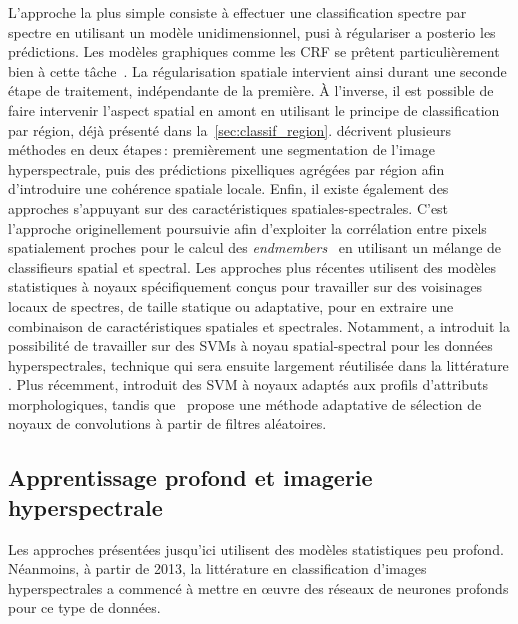L'approche la plus simple consiste à effectuer une classification spectre par spectre en utilisant un modèle unidimensionnel, pusi à régulariser a posterio les prédictions. Les modèles graphiques comme les \gls{CRF} se prêtent particulièrement bien à cette tâche~\cite{wu_semi-supervised_2016}. La régularisation spatiale intervient ainsi durant une seconde étape de traitement, indépendante de la première.
À l'inverse, il est possible de faire intervenir l'aspect spatial en amont en utilisant le principe de classification par région, déjà présenté dans la~\cref{sec:classif_region}. \citet{tarabalka_segmentation_2010,fauvel_advances_2013} décrivent plusieurs méthodes en deux étapes\,: premièrement une segmentation de l'image hyperspectrale, puis des prédictions pixelliques agrégées par région afin d'introduire une cohérence spatiale locale.
Enfin, il existe également des approches s'appuyant sur des caractéristiques spatiales-spectrales. C'est l'approche originellement poursuivie afin d'exploiter la corrélation entre pixels spatialement proches pour le calcul des \textit{endmembers}~\cite{plaza_spatial/spectral_2002,dellacqua_exploiting_2004} en utilisant un mélange de classifieurs spatial et spectral. Les approches plus récentes utilisent des modèles statistiques à noyaux spécifiquement conçus pour travailler sur des voisinages locaux de spectres, de taille statique ou adaptative, pour en extraire une combinaison de caractéristiques spatiales et spectrales. Notamment, \citet{camps-valls_composite_2006} a introduit la possibilité de travailler sur des \glspl{SVM} à noyau spatial-spectral pour les données hyperspectrales, technique qui sera ensuite largement réutilisée dans la littérature \cite{tarabalka_spectralspatial_2009,fauvel_spatial-spectral_2012}. Plus récemment, \citet{cui_scalable_2017} introduit des \gls{SVM} à noyaux adaptés aux profils d'attributs morphologiques, tandis que~\citet{tuia_multiclass_2015} propose une méthode adaptative de sélection de noyaux de convolutions à partir de filtres aléatoires.

\subsection{Apprentissage profond et imagerie hyperspectrale}

Les approches présentées jusqu'ici utilisent des modèles statistiques peu profond. Néanmoins, à partir de 2013, la littérature en classification d'images hyperspectrales a commencé à mettre en \oe{}uvre des réseaux de neurones profonds pour ce type de données.

